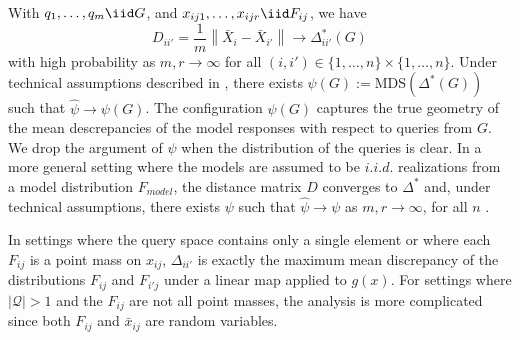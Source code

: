 With $ q_{1}, \hdots, q_{m} \iid G $, and $ x_{ij1}, \hdots, x_{ijr} \iid F_{ij} $, 
we have
\begin{equation}
    D_{i i'}=
    \frac{1}{m}
    \left\lVert 
\bar{X}_i-\bar{X}_{i'}
    \right\rVert
    \to 
    \Delta^{*}_{i i'}(G)
\end{equation}
with high probability
as $m,r \to \infty$ for all $ (i, i') \in \{1, \hdots, n\} \times \{1, \hdots, n\} $.
Under technical assumptions described in \cite{aranyak}, there exists $ \psi(G) := \text{MDS}(\Delta^{*}(G)) $ such that $ \widehat{\psi} \to \psi(G) $. The configuration $ \psi(G) $ captures the true geometry of the mean descrepancies of the model responses with respect to queries from $ G $.
We drop the argument of $ \psi $ when the distribution of the queries is clear.
In a more general setting where the models are assumed to be $ i.i.d. $ realizations from a model distribution $ F_{model}$, the distance matrix $ D $ converges to $ \Delta^{*} $ and, under technical assumptions, there exists $ \psi $ such that $ \widehat{\psi} \to \psi $ as $ m, r \to \infty $, for all $n$ \citep{aranyak}.


In settings where the query space contains only a single element or where each $ F_{ij} $ is a point mass on $ x_{ij} $, $ \Delta_{ii'} $ is exactly the maximum mean discrepancy \citep{gretton2012kernel} of the distributions $ F_{ij} $ and $ F_{i'j} $ under a linear map applied to $ g(x) $. 
For settings where $ | \mathscr{Q} | > 1 $ and the $ F_{ij} $ are not all point masses, the analysis is more complicated since both $ F_{ij} $ and $ \bar{x}_{ij}$ 
are random variables. 


